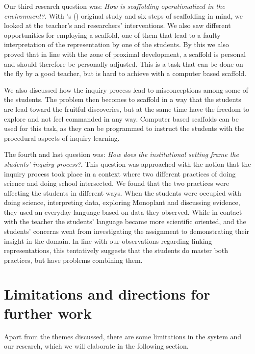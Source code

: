 
Our third research question was: \emph{How is scaffolding operationalized in the environment?}.
With \citeauthor{wood1976role}'s (\citeyear{wood1976role}) original study and six steps of scaffolding in mind, we looked at the teacher's and researchers' interventions.  We also saw different opportunities for employing a scaffold, one of them that lead to a faulty interpretation of the representation by one of the students. By this we also proved that in line with the zone of proximal development, a scaffold is personal and should therefore be personally adjusted. This is a task that can be done on the fly by a good teacher, but is hard to achieve with a computer based scaffold. 

We also discussed how the inquiry process lead to misconceptions among some of the students. The problem then becomes to scaffold in a way that the students are lead toward the fruitful discoveries, but at the same time have the freedom to explore and not feel commanded in any way. Computer based scaffolds can be used for this task, as they can be programmed to instruct the students with the procedural aspects of inquiry learning. 

The fourth and last question was: \emph{How does the institutional setting frame the students' inquiry process?}. This question was approached with the notion that the inquiry process took place in a context where two different practices of doing science and doing school intersected. We found that the two practices were affecting the students in different ways. When the students were occupied with doing science, interpreting data, exploring Monoplant and discussing evidence, they used an everyday language based on data they observed. While in contact with the teacher the students' language became more scientific oriented, and the students' concerns went from investigating the assignment to demonstrating their insight in the domain. In line with our observations regarding linking representations, this tentatively suggests that the students do master both practices, but have problems combining them.

\section{Limitations and directions for further work}
Apart from the themes discussed, there are some limitations in the system and our research, which we will elaborate in the following section. 


